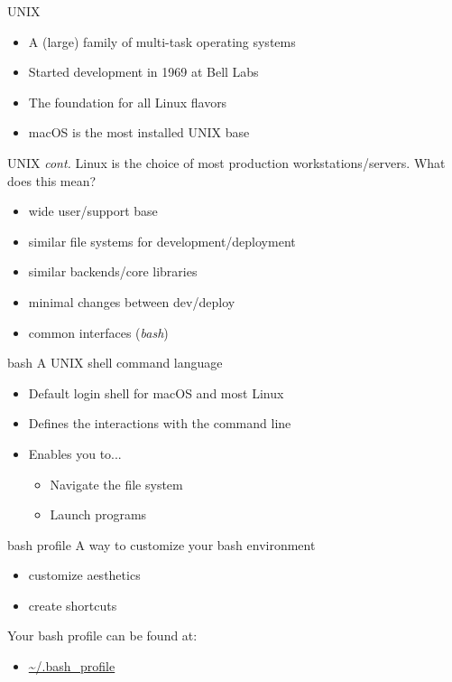 \documentclass[12pt,t]{beamer}
\begin{document}
\begin{frame}{UNIX}
	\begin{itemize}
		\item A (large) family of multi-task operating systems
		\item Started development in 1969 at Bell Labs
		\item The foundation for all Linux flavors
		\item macOS is the most installed UNIX base
	\end{itemize}
\end{frame}

\begin{frame}{UNIX \emph{cont.}}
	Linux is the choice of most production workstations/servers. What does this mean?
	\begin{itemize}
		\item wide user/support base
		\item similar file systems for development/deployment
		\item similar backends/core libraries
		\item minimal changes between dev/deploy
		\item common interfaces (\emph{bash})
	\end{itemize}
\end{frame}

\begin{frame}{bash}
	A UNIX shell command language
	\begin{itemize}
		\item Default login shell for macOS and most Linux
		\item Defines the interactions with the command line
		\item Enables you to...
		\begin{itemize}
			\item Navigate the file system
			\item Launch programs
		\end{itemize}
	\end{itemize}
\end{frame}

\begin{frame}{bash profile}
	A way to customize your bash environment
	\begin{itemize}
		\item customize aesthetics
		\item create shortcuts
	\end{itemize}
	Your bash profile can be found at:
	\begin{itemize}
		\item \url{~/.bash_profile}  %
	\end{itemize}
\end{frame}
\end{document}
